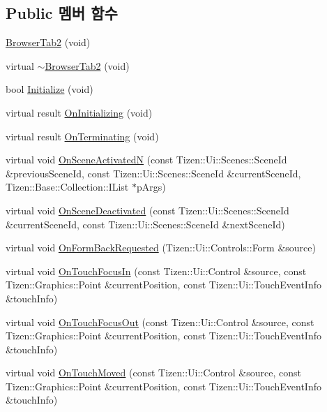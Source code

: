 \subsection*{Public 멤버 함수}
\begin{DoxyCompactItemize}
\item 
\hyperlink{class_browser_tab2_a62962f7968f3a49c155830506fbc114f}{Browser\+Tab2} (void)
\item 
virtual \hyperlink{class_browser_tab2_a2ab1c487499854f34b6c56f1316778fe}{$\sim$\+Browser\+Tab2} (void)
\item 
bool \hyperlink{class_browser_tab2_af5555db1615474a69781b25373828749}{Initialize} (void)
\item 
virtual result \hyperlink{class_browser_tab2_adcf8468f31192803a8e04918eb6accdc}{On\+Initializing} (void)
\item 
virtual result \hyperlink{class_browser_tab2_ad952cfb24c41293051b1bccd8de2fb39}{On\+Terminating} (void)
\item 
virtual void \hyperlink{class_browser_tab2_a46eb1eb3508c56f6d7b1527f51a1c6e3}{On\+Scene\+Activated\+N} (const Tizen\+::\+Ui\+::\+Scenes\+::\+Scene\+Id \&previous\+Scene\+Id, const Tizen\+::\+Ui\+::\+Scenes\+::\+Scene\+Id \&current\+Scene\+Id, Tizen\+::\+Base\+::\+Collection\+::\+I\+List $\ast$p\+Args)
\item 
virtual void \hyperlink{class_browser_tab2_adbfa27d7f11bd366806436fd6af76d7d}{On\+Scene\+Deactivated} (const Tizen\+::\+Ui\+::\+Scenes\+::\+Scene\+Id \&current\+Scene\+Id, const Tizen\+::\+Ui\+::\+Scenes\+::\+Scene\+Id \&next\+Scene\+Id)
\item 
virtual void \hyperlink{class_browser_tab2_aaade0a2a7467b6d22665d4e662508174}{On\+Form\+Back\+Requested} (Tizen\+::\+Ui\+::\+Controls\+::\+Form \&source)
\item 
virtual void \hyperlink{class_browser_tab2_a0b216b55b10d48a5b8c080e1d1dd6f53}{On\+Touch\+Focus\+In} (const Tizen\+::\+Ui\+::\+Control \&source, const Tizen\+::\+Graphics\+::\+Point \&current\+Position, const Tizen\+::\+Ui\+::\+Touch\+Event\+Info \&touch\+Info)
\item 
virtual void \hyperlink{class_browser_tab2_a1f6cf7a71d90dde56703906d60efaba0}{On\+Touch\+Focus\+Out} (const Tizen\+::\+Ui\+::\+Control \&source, const Tizen\+::\+Graphics\+::\+Point \&current\+Position, const Tizen\+::\+Ui\+::\+Touch\+Event\+Info \&touch\+Info)
\item 
virtual void \hyperlink{class_browser_tab2_a46c153ea3ce540cbcc5f0ec4e5dbea6e}{On\+Touch\+Moved} (const Tizen\+::\+Ui\+::\+Control \&source, const Tizen\+::\+Graphics\+::\+Point \&current\+Position, const Tizen\+::\+Ui\+::\+Touch\+Event\+Info \&touch\+Info)

\end{DoxyCompactItemize}
